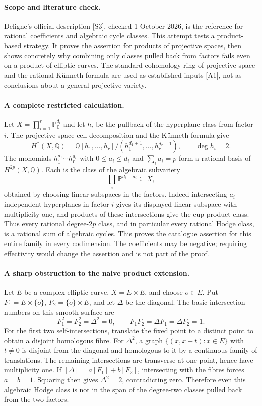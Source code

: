 \documentclass[11pt,a4paper]{article}
\begin{document}
\paragraph{Scope and literature check.}
Deligne's official description [S3], checked 1 October 2026, is the reference
for rational coefficients and algebraic cycle classes. This attempt tests a
product-based strategy. It proves the assertion for products of projective
spaces, then shows concretely why combining only classes pulled back from
factors fails even on a product of elliptic curves. The standard cohomology
ring of projective space and the rational K\"unneth formula are used as
established inputs [A1], not as conclusions about a general projective variety.

\paragraph{A complete restricted calculation.}
Let $X=\prod_{i=1}^r\mathbb P^{d_i}_{\mathbb C}$ and let $h_i$ be the pullback
of the hyperplane class from factor $i$. The projective-space cell
decomposition and the K\"unneth formula give
\[
 H^*(X,\mathbb Q)=\mathbb Q[h_1,\ldots,h_r]/
                   (h_1^{d_1+1},\ldots,h_r^{d_r+1}),\qquad \deg h_i=2.
\]
The monomials $h_1^{a_1}\cdots h_r^{a_r}$ with $0\le a_i\le d_i$ and
$\sum_i a_i=p$ form a rational basis of $H^{2p}(X,\mathbb Q)$.
Each is the class of the algebraic subvariety
\[
                  \prod_i\mathbb P^{d_i-a_i}\subseteq X,
\]
obtained by choosing linear subspaces in the factors. Indeed intersecting
$a_i$ independent hyperplanes in factor $i$ gives its displayed linear
subspace with multiplicity one, and products of these intersections give
the cup product class. Thus every rational degree-$2p$ class, and in
particular every rational Hodge class, is a rational sum of algebraic cycles.
This proves the catalogue assertion for this entire family in every
codimension. The coefficients may be negative; requiring effectivity would
change the assertion and is not part of the proof.

\paragraph{A sharp obstruction to the naive product extension.}
Let $E$ be a complex elliptic curve, $X=E\times E$, and choose $o\in E$.
Put $F_1=E\times\{o\}$, $F_2=\{o\}\times E$, and let $\Delta$ be the diagonal.
The basic intersection numbers on this smooth surface are
\[
 F_1^2=F_2^2=\Delta^2=0,\qquad F_1F_2=\Delta F_1=\Delta F_2=1.
\]
For the first two self-intersections, translate the fixed point to a distinct
point to obtain a disjoint homologous fibre. For $\Delta^2$, a graph
$\{(x,x+t):x\in E\}$ with $t\ne0$ is disjoint from the diagonal and homologous
to it by a continuous family of translations. The remaining intersections
are transverse at one point, hence have multiplicity one.
If $[\Delta]=a[F_1]+b[F_2]$, intersecting with the fibres forces $a=b=1$.
Squaring then gives $\Delta^2=2$, contradicting zero. Therefore even this
algebraic Hodge class is not in the span of the degree-two classes pulled
back from the two factors.
\end{document}
